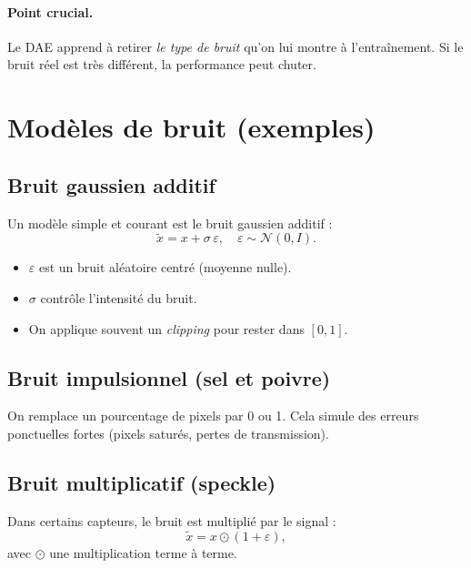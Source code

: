 \documentclass[11pt,a4paper]{article}
\begin{document}
\paragraph{Point crucial.}
Le DAE apprend à retirer \emph{le type de bruit} qu'on lui montre à l'entraînement.
Si le bruit réel est très différent, la performance peut chuter.

\section{Modèles de bruit (exemples)}

\subsection{Bruit gaussien additif}

Un modèle simple et courant est le bruit gaussien additif :
\begin{equation}
  \tilde{x} = x + \sigma\,\varepsilon,\quad \varepsilon\sim\mathcal{N}(0,I).
\end{equation}

\begin{itemize}
  \item $\varepsilon$ est un bruit aléatoire centré (moyenne nulle).
  \item $\sigma$ contrôle l'intensité du bruit.
  \item On applique souvent un \emph{clipping} pour rester dans $[0,1]$.
\end{itemize}

\subsection{Bruit impulsionnel (sel et poivre)}

On remplace un pourcentage de pixels par 0 ou 1.
Cela simule des erreurs ponctuelles fortes (pixels saturés, pertes de transmission).

\subsection{Bruit multiplicatif (speckle)}

Dans certains capteurs, le bruit est multiplié par le signal :
\begin{equation}
  \tilde{x} = x\odot(1+\varepsilon),
\end{equation}
avec $\odot$ une multiplication terme à terme.
\end{document}
